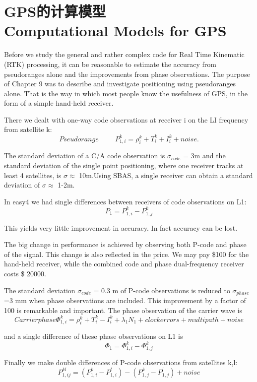 \section[GPS的计算模型]{GPS的计算模型\\Computational Models for GPS}
Before we study the general and rather complex code for Real Time Kinematic (RTK) processing, it can be reasonable to estimate the accuracy from pseudoranges alone and the improvements from phase observations. The purpose of Chapter 9 was to describe and investigate positioning using pseudoranges alone. That is the way in which most people know the usefulness of GPS, in the form of a simple hand-held receiver.

There we dealt with one-way code observations at receiver i on the LI frequency
from satellite k:
$$
Pseudorange \hspace{1cm} P_{1,i}^{k}=\rho_{i}^{k}+T_{i}^{k}+I_{i}^{k}+noise.
$$

The standard deviation of a C/A code observation is $\sigma_{code}$ = 3m and the standard deviation of the single point positioning, where one receiver tracks at least 4 satellites, is $\sigma \approx$ 10m.Using SBAS, a single receiver can obtain a standard deviation of $\sigma \approx$ 1-2m.

In easy4 we had single differences between receivers of code observations on L1:
$$
P_{1}=P_{1,i}^{k}-P_{1,j}^{k}
$$

This yields very little improvement in accuracy. In fact accuracy can be lost.

The big change in performance is achieved by observing both P-code and phase of the signal. This change is also reflected in the price. We may pay \$100 for the hand-held receiver, while the combined code and phase dual-frequency receiver costs \$ 20000.

The standard deviation $\sigma_{code}$ = 0.3 m of P-code observations is reduced to  $\sigma_{phase}$ =3 mm when phase observations are included. This improvement by a factor of 100 is remarkable and important. The phase observation of the carrier wave is
$$
Carrier phase  \Phi_{1,i}^{k}=\rho_{i}^{k}+T_{i}^{k}-I_{i}^{k}+\lambda_{1}N_{1}+ clock errors + multipath + noise
$$

and a single difference of these phase observations on L1 is
$$
\Phi_{1}=\Phi_{1,i}^{k}-\Phi_{1,j}^{k}
$$

Finally we make double differences of P-code observations from satellites k,l:
$$
P_{1,ij}^{kl}=(P_{1,i}^{k}-P_{1,i}^{l})-(P_{1,j}^{k}-P_{1,j}^{l})+noise
$$

